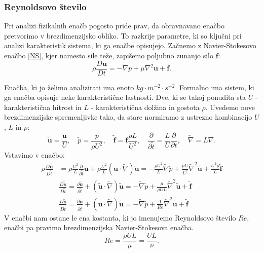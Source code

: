 \documentclass[mat2, tisk]{fmfdelo}
\newcommand{\bd}{\textbf}
\begin{document}
\subsubsection{Reynoldsovo število}
Pri analizi fizikalnih enačb pogosto pride prav, da obravnavano enačbo pretvorimo 
v brezdimenzijsko obliko. To razkrije 
parametre, ki so ključni pri analizi karakteristik sistema, ki ga enačbe opisujejo. 
Začnemo z Navier-Stokesovo enačbo \eqref{NS}, kjer namesto sile teže, zapišemo 
poljubno zunanjo silo $\bd{f}$:
$$
\rho \frac{D \bd{u}}{D t} = - \nabla p + \mu \nabla^2 \bd{u} + \bd{f}.
$$

Enačba, ki jo želimo analizirati ima enoto $kg \cdot m^{-2}\cdot s^{-2}$. Formalno 
ima sistem, ki ga enačba opisuje neke karakteristične lastnosti. Dve, ki se takoj ponudita 
sta $U$ - karakteristična hitrost in $L$ - karakteristična dolžina in gostota $\rho$. Uvedemo nove brezdimenzijske
spremenljivke tako, da stare normiramo z ustrezno kombinacijo $U$, $L$ in $\rho$:
$$
\tilde{\bd{u}} = \frac{\bd{u}}{U}, \quad \tilde{p} = \frac{p}{\rho U^2}, \quad \tilde{\bd{f}} = \bd{f}\frac{\rho L}{U^2},
\quad \frac{\partial}{\partial \tilde{t}} = \frac{L}{U} \frac{\partial}{\partial t}, \quad 
\tilde{\nabla} = L\nabla.
$$
Vstavimo v enačbo:
\begin{align*}
\rho \frac{D\tilde{\bd{u}}}{D \tilde{t}} &= \rho \frac{U^2}{L} \frac{\partial}{\partial \tilde{t}} \tilde{\bd{u}} + 
\rho \frac{U^2}{L} (\tilde{\bd{u}} \cdot \tilde{\nabla}) \tilde{\bd{u}} = - \frac{\rho U^2}{L} \tilde{\nabla} \tilde{p}
+ \frac{\mu U}{L^2} \tilde{\nabla}^2 \tilde{\bd{u}} + \frac{U^2 \rho}{L}\tilde{\bd{f}} \\[2mm]
&\frac{D\tilde{u}}{D \tilde{t}} = \frac{\partial \tilde{\bd{u}}}{\partial \tilde{t}} + 
(\tilde{\bd{u}} \cdot \tilde{\nabla}) \tilde{\bd{u}} = - \tilde{\nabla} \tilde{p}
+ \frac{\mu}{\rho UL} \tilde{\nabla}^2 \tilde{\bd{u}} + \tilde{\bd{f}} \\[2mm]
&\frac{D\tilde{u}}{D \tilde{t}} = \frac{\partial \tilde{\bd{u}}}{\partial \tilde{t}} + 
(\tilde{\bd{u}} \cdot \tilde{\nabla}) \tilde{\bd{u}} = - \tilde{\nabla} \tilde{p}
+ \frac{1}{Re} \tilde{\nabla}^2 \tilde{\bd{u}} + \tilde{\bd{f}}
\end{align*}
V enačbi nam ostane le ena kostanta, ki jo imenujemo Reynoldsovo število $Re$, enačbi pa pravimo brezdimenzijska Navier-Stokesova enačba.
\begin{equation}
Re = \frac{\rho UL}{\mu} = \frac{UL}{\nu}.
\end{equation}
\end{document}
